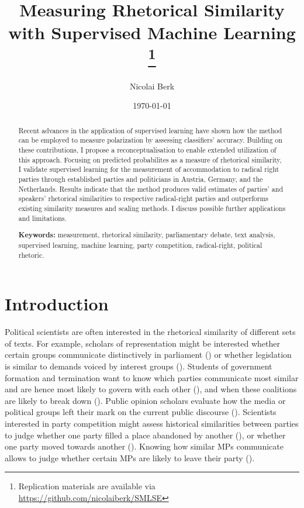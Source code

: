 \documentclass{article}
\title{Measuring Rhetorical Similarity with Supervised Machine Learning
\footnote{Replication materials are available via \href{https://github.com/nicolaiberk/SMLSE}{https://github.com/nicolaiberk/SMLSE}}
}
\author{Nicolai Berk}
\date{\today}
\begin{document}
\maketitle

\begin{abstract}
Recent advances in the application of supervised learning have shown how the method can be employed to measure polarization by assessing classifiers' accuracy. Building on these contributions, I propose a reconceptualisation to enable extended utilization of this approach. Focusing on predicted probabilites as a measure of rhetorical similarity, I validate supervised learning for the measurement of accommodation to radical right parties through established parties and politicians in Austria, Germany, and the Netherlands. Results indicate that the method produces valid estimates of parties' and speakers' rhetorical similarities to respective radical-right parties and outperforms existing similarity measures and scaling methods. I discuss possible further applications and limitations.\par \medskip


\textbf{Keywords:} measurement, rhetorical similarity, parliamentary debate, text analysis, supervised learning, machine learning, party competition, radical-right, political rhetoric.
\end{abstract}



\section{Introduction}
\label{sec:Intro}
Political scientists are often interested in the rhetorical similarity of different sets of texts. For example, scholars of representation might be interested whether certain groups communicate distinctively in parliament (\cite{Pitkin1967}) or whether legislation is similar to demands voiced by interest groups (\cite{Gilens2014a}). Students of government formation and termination want to know which parties communicate most similar and are hence most likely to govern with each other (\cite{Gamson1961}), and when these coalitions are likely to break down (\cite{Grofman1994}). Public opinion scholars evaluate how the media or political groups left their mark on the current public discourse (\cite{Zaller1992}). Scientists interested in party competition might assess historical similarities between parties to judge whether one party filled a place abandoned by another (\cite{Kitschelt1986}), or whether one party moved towards another (\cite{Downs1957}). Knowing how similar MPs communicate allows to judge whether certain MPs are likely to leave their party (\cite{Hirschman1970}).\par
\end{document}
